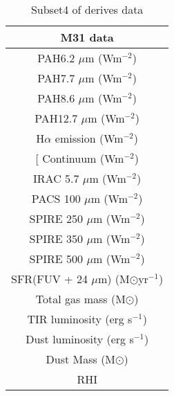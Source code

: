 \begin{table}
\centering
\caption{Subset4 of derives data}
\label{tab: subset4}
\begin{tabular}{ |c| }
\hline
M31 data  \\
\hline\hline
PAH6.2 $\mu$m (Wm$^{-2}$)  \\
PAH7.7 $\mu$m (Wm$^{-2}$)  \\
PAH8.6 $\mu$m (Wm$^{-2}$)  \\
PAH12.7 $\mu$m (Wm$^{-2}$)  \\
H$\alpha$ emission (Wm$^{-2}$) \\
{[}\sii{]} Continuum (Wm$^{-2}$)  \\
IRAC 5.7 $\mu$m (Wm$^{-2}$)\\
PACS 100 $\mu$m (Wm$^{-2}$)\\
SPIRE 250 $\mu$m (Wm$^{-2}$)\\
SPIRE 350 $\mu$m (Wm$^{-2}$)\\
SPIRE 500 $\mu$m (Wm$^{-2}$)\\
SFR(FUV + 24 $\mu$m) (M$\odot$yr$^{-1}$) \\
Total gas mass (M$\odot$)  \\
TIR luminosity (erg s$^{-1}$)  \\
Dust luminosity (erg s$^{-1}$)  \\
Dust Mass (M$\odot$)\\
RHI \\
\hline
\end{tabular}
\end{table}